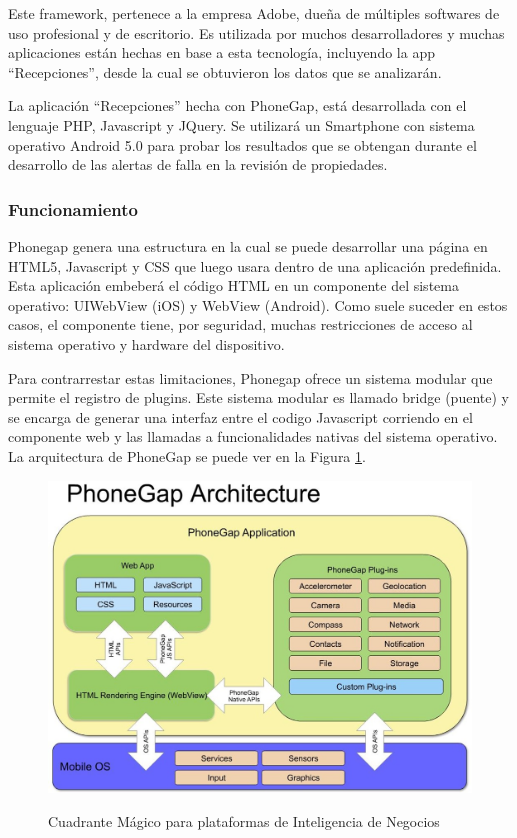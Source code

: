 \documentclass[letter,12pt,oneside]{report}
\begin{document}
Este framework, pertenece a la empresa Adobe, dueña de múltiples softwares de uso profesional y de escritorio. Es utilizada por muchos desarrolladores y muchas aplicaciones están hechas en base a esta tecnología, incluyendo la app “Recepciones”, desde la cual se obtuvieron los datos que se analizarán.

La aplicación “Recepciones” hecha con PhoneGap, está desarrollada con el lenguaje PHP, Javascript y JQuery. Se utilizará un Smartphone con sistema operativo Android 5.0 para probar los resultados que se obtengan durante el desarrollo de las alertas de falla en la revisión de propiedades.

\subsubsection{Funcionamiento}
Phonegap genera una estructura en la cual se puede desarrollar una página en HTML5, Javascript y CSS que luego usara dentro de una aplicación predefinida. Esta aplicación embeberá el código HTML en un componente del sistema operativo: UIWebView (iOS) y WebView (Android). Como suele suceder en estos casos, el componente tiene, por seguridad, muchas restricciones de acceso al sistema operativo y hardware del dispositivo. \cite{phonegap}

Para contrarrestar estas limitaciones, Phonegap ofrece un sistema modular que permite el registro de plugins. Este sistema modular es llamado bridge (puente) y se encarga de generar una interfaz entre el codigo Javascript corriendo en el componente web y las llamadas a funcionalidades nativas del sistema operativo. La arquitectura de PhoneGap se puede ver en la Figura \ref{phonegap}.

\begin{figure}[H]
\begin{center}
\includegraphics[scale=0.5]{images/phonegap.jpg}
\caption{Cuadrante Mágico para plataformas de Inteligencia de Negocios}
\label{phonegap}
\end{center}
\end{figure}
\end{document}
